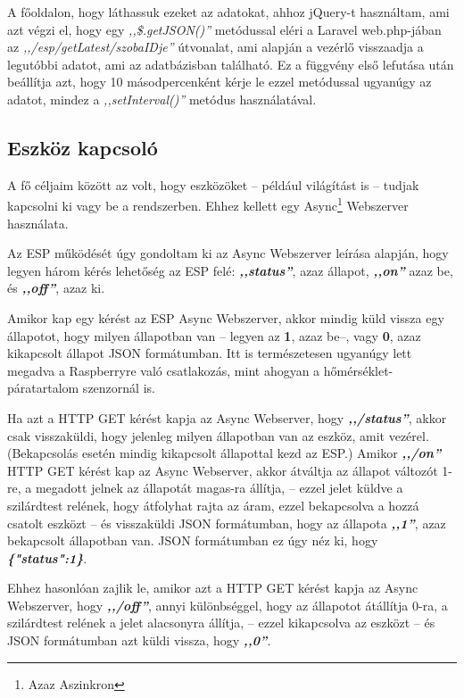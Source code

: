 \documentclass[
]{thesis-ekf}
\theoremstyle{definition}
\theoremstyle{remark}
\begin{document}
	A főoldalon, hogy láthassuk ezeket az adatokat, ahhoz jQuery-t használtam, ami azt végzi el, hogy egy \emph{,,\$.getJSON()''} metódussal eléri a Laravel web.php-jában az \emph{,,/esp/getLatest/szobaIDje''} útvonalat, ami alapján a vezérlő visszaadja a legutóbbi adatot, ami az adatbázisban található. Ez a függvény első lefutása után beállítja azt, hogy 10 másodpercenként kérje le ezzel metódussal ugyanúgy az adatot, mindez a \emph{,,setInterval()''} metódus használatával.
	
	\subsection{Eszköz kapcsoló}\label{toggle}
	
	A fő céljaim között az volt, hogy eszközöket -- például világítást is -- tudjak kapcsolni ki vagy be a rendszerben. Ehhez kellett egy Async\footnote{Azaz Aszinkron} Webszerver\cite{async-webserver} használata.
	
	Az ESP működését úgy gondoltam ki az Async Webszerver leírása alapján, hogy legyen három kérés lehetőség az ESP felé: \emph{\textbf{,,status''}}, azaz állapot, \emph{\textbf{,,on''}} azaz be, és \emph{\textbf{,,off''}}, azaz ki. 
	
	Amikor kap egy kérést az ESP Async Webszerver, akkor mindig küld vissza egy állapotot, hogy milyen állapotban van -- legyen az \textbf{1}, azaz be--, vagy \textbf{0}, azaz kikapcsolt állapot JSON formátumban. Itt is természetesen ugyanúgy lett megadva a Raspberryre való csatlakozás, mint ahogyan a hőmérséklet-páratartalom szenzornál is.
	
	Ha azt a HTTP GET kérést kapja az Async Webserver, hogy \emph{\textbf{,,/status''}}, akkor csak visszaküldi, hogy jelenleg milyen állapotban van az eszköz, amit vezérel. (Bekapcsolás esetén mindig kikapcsolt állapottal kezd az ESP.) Amikor \emph{\textbf{,,/on''}} HTTP GET kérést kap az Async Webserver, akkor átváltja az állapot változót 1-re, a megadott jelnek az állapotát magas-ra állítja, -- ezzel jelet küldve a szilárdtest relének, hogy átfolyhat rajta az áram, ezzel bekapcsolva a hozzá csatolt eszközt -- és visszaküldi JSON formátumban, hogy az állapota \emph{\textbf{,,1''}}, azaz bekapcsolt állapotban van. JSON formátumban ez úgy néz ki, hogy \textbf{\emph{\{"status":1\}}}.
	
	Ehhez hasonlóan zajlik le, amikor azt a HTTP GET kérést kapja az Async Webszerver, hogy \emph{\textbf{,,/off''}}, annyi különbséggel, hogy az állapotot átállítja 0-ra, a szilárdtest relének a jelet alacsonyra állítja, -- ezzel kikapcsolva az eszközt -- és JSON formátumban azt küldi vissza, hogy \emph{\textbf{,,0''}}.
	
\end{document}
